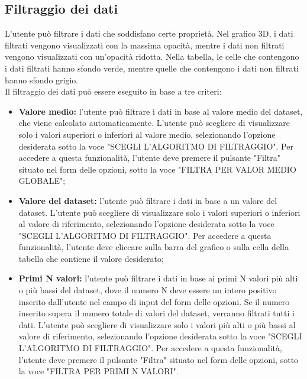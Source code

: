 \subsection{Filtraggio dei dati}
L'utente può filtrare i dati che soddisfano certe proprietà. Nel grafico 3D, i
dati filtrati vengono visualizzati con la massima opacità, mentre i dati non
filtrati vengono visualizzati con un'opacità ridotta. Nella tabella, le celle
che contengono i dati filtrati hanno sfondo verde, mentre quelle che contengono
i dati non filtrati hanno sfondo grigio. \\ Il filtraggio dei dati può essere
eseguito in base a tre criteri:
\begin{itemize}
    \item \textbf{Valore medio:} l'utente può filtrare i dati in base al valore
          medio del dataset, che viene calcolato automaticamente. L'utente può
          scegliere di visualizzare solo i valori superiori o inferiori al valore
          medio, selezionando l'opzione desiderata sotto la voce "SCEGLI
          L'ALGORITMO DI FILTRAGGIO". Per accedere a questa funzionalità, l'utente
          deve premere il pulsante "Filtra" situato nel
          form delle opzioni, sotto la voce "FILTRA PER VALOR MEDIO GLOBALE";
    \item \textbf{Valore del dataset:} l'utente può filtrare i dati in base a un
          valore del dataset. L'utente
          può scegliere di visualizzare solo i valori superiori o inferiori al
          valore di riferimento, selezionando l'opzione desiderata sotto la voce
          "SCEGLI L'ALGORITMO DI FILTRAGGIO". Per accedere a questa funzionalità,
          l'utente deve cliccare sulla barra del grafico o sulla cella della tabella che contiene il
          valore desiderato;
    \item \textbf{Primi N valori:} l'utente può filtrare i dati in base ai primi N
          valori più alti o più bassi del dataset, dove il numero N deve essere un intero positivo
          inserito dall'utente nel campo di input del form delle opzioni. Se il numero inserito supera il numero totale di valori
          del dataset, verranno filtrati tutti i dati. L'utente può scegliere di visualizzare solo i valori
          più alti o più bassi al valore di riferimento, selezionando l'opzione
          desiderata sotto la voce "SCEGLI L'ALGORITMO DI FILTRAGGIO". Per accedere a questa funzionalità,
          l'utente deve premere il pulsante "Filtra" situato nel form delle
          opzioni, sotto la voce "FILTRA PER PRIMI N VALORI".
\end{itemize}
